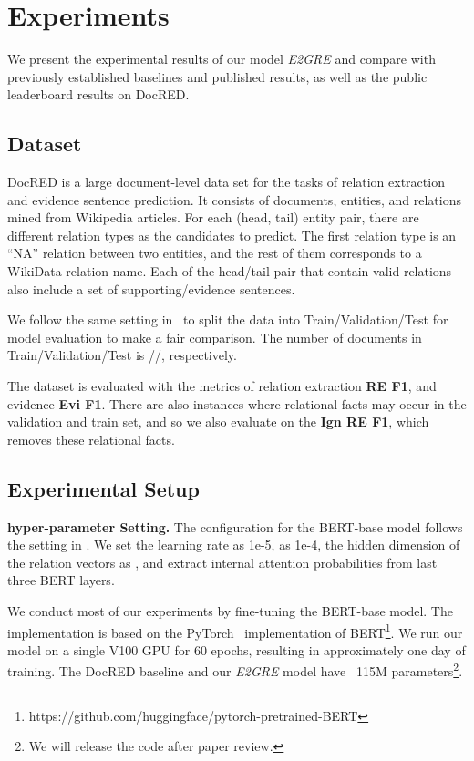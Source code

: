 \documentclass[11pt,a4paper]{article}
\begin{document}
\section{Experiments}
We present the experimental results of our model {\em E2GRE} and compare with previously established baselines and published results, as well as the public leaderboard results on DocRED.

\subsection{Dataset}

\noindent DocRED \cite{docred} is a large document-level data set for the tasks of relation extraction and evidence sentence prediction. 
It consists of  documents,  entities, and  relations mined from Wikipedia articles. 
For each (head, tail) entity pair, there are  different relation types as the candidates to predict. 
The first relation type is an ``NA'' relation between two entities, and the rest of them corresponds to a WikiData relation name.
Each of the head/tail pair that contain valid relations also include a set of supporting/evidence sentences. 

We follow the same setting in~\cite{docred} to split the data into Train/Validation/Test for model evaluation to make a fair comparison. The number of documents in Train/Validation/Test is //, respectively.

The dataset is evaluated with the metrics of relation extraction \textbf{RE F1}, and evidence \textbf{Evi F1}.
There are also instances where relational facts may occur in the validation and train set, and so we also evaluate on the \textbf{Ign RE F1}, which removes these relational facts.



\subsection{Experimental Setup}
\noindent\textbf{hyper-parameter Setting.} The configuration for the BERT-base model follows the setting in \cite{devlin-bert}. We set the learning rate as 1e-5,  as 1e-4, the hidden dimension of the relation vectors as , and extract internal attention probabilities from last three BERT layers. 

We conduct most of our experiments by fine-tuning the BERT-base model. The implementation is based on the PyTorch~\cite{paszke2017automatic} implementation of BERT\footnote{https://github.com/huggingface/pytorch-pretrained-BERT}. We run our model on a single V100 GPU for 60 epochs, resulting in approximately one day of training. The DocRED baseline and our {\em E2GRE} model have ~115M parameters\footnote{We will release the code after paper review.}. 
\end{document}
